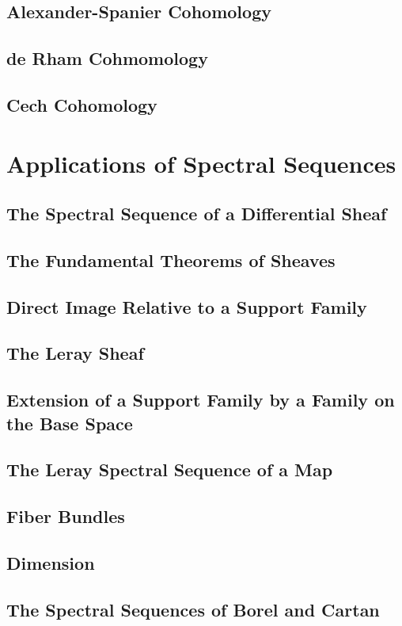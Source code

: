 \subsection{Alexander-Spanier Cohomology}
\subsection{de Rham Cohmomology}
\subsection{Cech Cohomology}

\section{Applications of Spectral Sequences}
\subsection{The Spectral Sequence of a Differential Sheaf}
\subsection{The Fundamental Theorems of Sheaves}
\subsection{Direct Image Relative to a Support Family}
\subsection{The Leray Sheaf}
\subsection{Extension of a Support Family by a Family on the Base Space}
\subsection{The Leray Spectral Sequence of a Map}
\subsection{Fiber Bundles}
\subsection{Dimension}
\subsection{The Spectral Sequences of Borel and Cartan}
